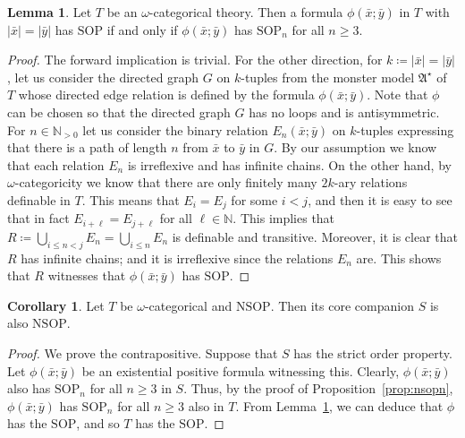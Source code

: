 \documentclass{amsart}
\theoremstyle{definition}
\newtheorem{lemma}[theorem]{Lemma}
\newtheorem{corollary}[theorem]{Corollary}
\theoremstyle{remark}
\numberwithin{equation}{section}
\newcommand\green[1]{\textcolor{green!50!black}{#1}}
\newcommand{\fa}{\mathfrak{A}}
\begin{document}

\begin{lemma}\label{lem:NSOPomega}
	Let $T$ be an $\omega$-categorical theory. Then {a formula $\phi(\bar{x};\bar{y})$ in $T$ with $|\bar{x}|=|\bar{y}|$ has $\mathrm{SOP}$ if and only if} 
    $\phi(\bar{x};\bar{y})$ %
has $\mathrm{SOP}_n$ for all $n\geq 3$.
\end{lemma}

\begin{proof}
	{The forward implication is trivial.} For the other direction, for ${k\coloneqq}|\bar{x}|=|\bar{y}|$, let us consider the directed graph $G$ on $k$-tuples from the monster model $\fa^\star$ of $T$ whose directed edge relation is defined by the formula $\phi(\bar{x};\bar{y})$. Note that $\phi$ can be chosen so that the directed graph $G$ has no loops and is antisymmetric. For $n\in \mathbb{N}_{>0}$ %
    let us consider the binary relation $E_n(\bar{x};\bar{y})$ on $k$-tuples expressing that there is a path of length $n$ from $\bar{x}$ to $\bar{y}$ in $G$. By our assumption we know that each relation $E_n$ is irreflexive and has infinite chains. On the other hand, by $\omega$-categoricity we know that there are only finitely many $2k$-ary relations definable in $T$. This means that $E_i=E_j$ for some $i<j$, and then it is easy to see that in fact $E_{i+\ell}=E_{j+\ell}$ for all $\ell\in \mathbb{N}$. This implies that $R\coloneqq \bigcup_{i\leq n< j}E_n=\bigcup_{i\leq n}E_n$ is definable and transitive.
Moreover, it is clear that $R$ %
has infinite chains; and it is irreflexive since the {relations $E_n$ are}. This shows that $R$ witnesses that {$\phi(\bar{x};\bar{y})$} has $\mathrm{SOP}$.
\end{proof}

\begin{corollary}\label{cor:NSOP} 
	Let $T$ be $\omega$-categorical and $\mathrm{NSOP}$. Then its core companion $S$ is also $\mathrm{NSOP}$.
\end{corollary}
\begin{proof}
	We prove the contrapositive. Suppose that $S$ has the strict order property. Let $\phi(\bar{x};\bar{y})$ be an existential positive formula witnessing this. Clearly, $\phi(\bar{x};\bar{y})$ also has $\mathrm{SOP}_n$ for all $n\geq 3$ in $S$. Thus, by the proof of Proposition~\ref{prop:nsopn}, $\phi(\bar{x}; \bar{y})$ has $\mathrm{SOP}_n$ for all $n\geq 3$ also in $T$. From  Lemma~\ref{lem:NSOPomega}, we can deduce that $\phi$ has the $\mathrm{SOP}$, and so $T$ has the $\mathrm{SOP}$.
\end{proof}
\end{document}
